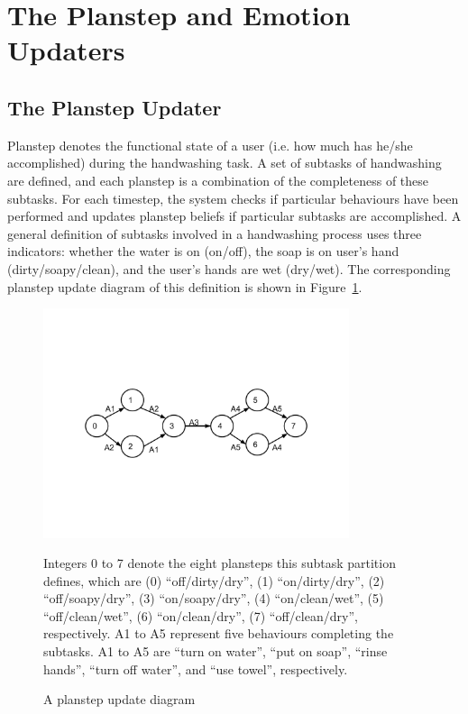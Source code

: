 \section{The Planstep and Emotion Updaters}
\subsection{The Planstep Updater}

Planstep denotes the functional state of a user (i.e. how much has he/she accomplished) during the handwashing task. A set of subtasks of handwashing are defined, and each planstep is a combination of the completeness of these subtasks. For each timestep, the system checks if particular behaviours have been performed and updates planstep beliefs if particular subtasks are accomplished. A general definition of subtasks involved in a handwashing process uses three indicators: whether the water is on (on/off), the soap is on user's hand (dirty/soapy/clean), and the user's hands are wet (dry/wet). The corresponding planstep update diagram of this definition is shown in Figure~\ref{fig:planstep}.

\begin{figure}[htp]
\centering
\includegraphics[trim = 20mm 50mm 20mm 50mm, clip, width=0.8\textwidth]{fig/fig-planstep.pdf}
\caption{A planstep update diagram}
\vspace*{2mm}
\parbox{0.85\linewidth}{Integers 0 to 7 denote the eight plansteps this subtask partition defines, which are (0) ``off/dirty/dry'', (1) ``on/dirty/dry'', (2) ``off/soapy/dry'', (3) ``on/soapy/dry'', (4) ``on/clean/wet'', (5) ``off/clean/wet'', (6) ``on/clean/dry'', (7) ``off/clean/dry'', respectively. A1 to A5 represent five behaviours completing the subtasks. A1 to A5 are ``turn on water'', ``put on soap'', ``rinse hands'', ``turn off water'', and ``use towel'', respectively.}
\label{fig:planstep}
\end{figure}

